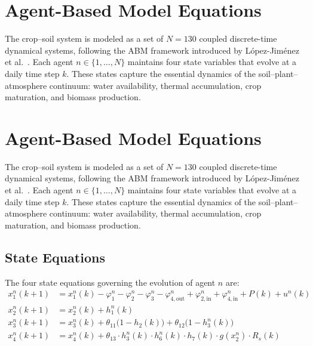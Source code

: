 
\section{Agent-Based Model Equations}
\label{sec:abm_equations}

The crop--soil system is modeled as a set of $N = 130$ coupled discrete-time dynamical systems, following the ABM framework introduced by L\'{o}pez-Jim\'{e}nez et al.~\cite{Lopezjimenez2024}. Each agent $n \in \{1, \ldots, N\}$ maintains four state variables that evolve at a daily time step $k$. These states capture the essential dynamics of the soil--plant--atmosphere continuum: water availability, thermal accumulation, crop maturation, and biomass production.

\section{Agent-Based Model Equations}
\label{sec:abm_equations}

The crop--soil system is modeled as a set of $N = 130$ coupled discrete-time dynamical systems, following the ABM framework introduced by L\'{o}pez-Jim\'{e}nez et al.~\cite{Lopezjimenez2024}. Each agent $n \in \{1, \ldots, N\}$ maintains four state variables that evolve at a daily time step $k$. These states capture the essential dynamics of the soil--plant--atmosphere continuum: water availability, thermal accumulation, crop maturation, and biomass production.

\subsection{State Equations}
\label{sec:state_equations}

The four state equations governing the evolution of agent $n$ are:
\begin{align}
    x_1^n(k+1) &= x_1^n(k) - \varphi_1^n - \varphi_2^n - \varphi_3^n - \varphi_{4,\text{out}}^n + \varphi_{2,\text{in}}^n + \varphi_{4,\text{in}}^n + P(k) + u^n(k) \label{eq:x1} \\
    x_2^n(k+1) &= x_2^n(k) + h_1^n(k) \label{eq:x2} \\
    x_3^n(k+1) &= x_3^n(k) + \theta_{11}\bigl(1 - h_2(k)\bigr) + \theta_{12}\bigl(1 - h_3^n(k)\bigr) \label{eq:x3} \\
    x_4^n(k+1) &= x_4^n(k) + \theta_{13} \cdot h_3^n(k) \cdot h_6^n(k) \cdot h_7(k) \cdot g(x_2^n) \cdot R_s(k) \label{eq:x4}
\end{align}

